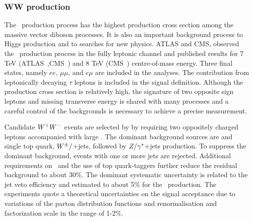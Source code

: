 \subsubsection{WW production}
\label{sss-WWprod}

The \WW\ production process has the highest production cross section
among the massive vector diboson processes. It is also an important
background process to Higgs production and to searches for new physics.
ATLAS and CMS, observed the \WW\ production process in 
the fully leptonic channel and published results for 7 TeV 
(ATLAS~\cite{ATLAS:2012mec},CMS~\cite{Chatrchyan:2013yaa}) and
8 TeV (CMS~\cite{Chatrchyan:2013oev}) centre-of-mass energy. 
Three final states, namely $ee$, $\mu\mu$, and $e\mu$ are included in the analyses. 
The contribution from leptonically decaying $\tau$ leptons is included in the signal
definition. Although the production cross section is relatively high, the signature of two opposite 
sign leptons and missing transverse energy is shared with many processes and a careful
control of the backgrounds is necessary to achieve a precise measurement.


Candidate $W^+W^-$ events are selected by by requiring two oppositely charged leptons 
accompanied with large \MET. 
The dominant background sources are \ttbar\; and single top quark, 
$W^{\pm}/$+jets, followed by $Z/\gamma^{*}$+jets production.
To suppress the dominant \ttbar\; background, events with one or more jets are rejected.   
Additional requirements on \MET\ and the use of top quark-taggers further reduce the residual background
to about 30\%.  
The dominant systematic uncertainty is related to the jet veto efficiency 
and estimated to about 5\% for the \WW\, production. 
The experiments quote a theoretical uncertainties on the signal acceptance due to 
variations of the parton distribution functions and renormalisation and factorization 
scale in the range of 1-2\%.

